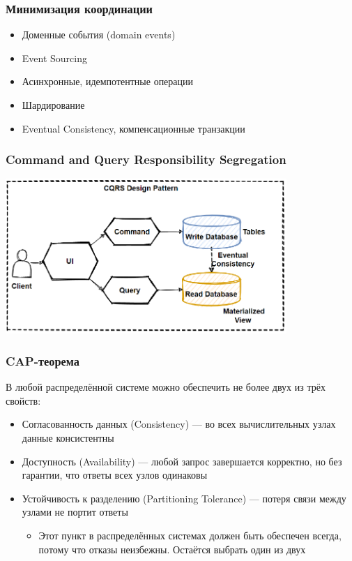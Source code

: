 \documentclass{../../slides-style}
\begin{document}
    \begin{frame}
        \frametitle{Минимизация координации}
        \begin{itemize}
            \item Доменные события (domain events)
            \item Event Sourcing
            \item Асинхронные, идемпотентные операции
            \item Шардирование
            \item Eventual Consistency, компенсационные транзакции
        \end{itemize}
    \end{frame}

    \begin{frame}
        \frametitle{Command and Query Responsibility Segregation}
        \begin{center}
            \includegraphics[width=0.8\textwidth]{cqrs.png}
        \end{center}
    \end{frame}

    \begin{frame}
        \frametitle{CAP-теорема}
        В любой распределённой системе можно обеспечить не более двух из трёх свойств:
        \begin{itemize}
            \item Согласованность данных (Consistency) --- во всех вычислительных узлах данные консистентны
            \item Доступность (Availability) --- любой запрос завершается корректно, но без гарантии, что ответы всех узлов одинаковы
            \item Устойчивость к разделению (Partitioning Tolerance) --- потеря связи между узлами не портит ответы
            \begin{itemize}
                \item Этот пункт в распределённых системах должен быть обеспечен всегда, потому что отказы неизбежны. Остаётся выбрать один из двух
            \end{itemize}
        \end{itemize}
    \end{frame}
\end{document}
